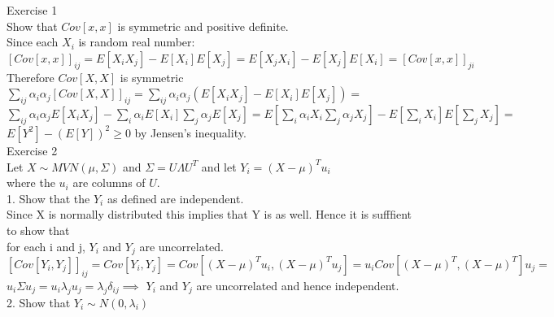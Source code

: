 \documentclass[18pt]{article}
\author{Adam Handwerger}
\begin{document}
\begin{flushleft}
Exercise 1\\
Show that $Cov[x,x]$ is symmetric and positive definite.\\
\vspace{.4cm}
Since each $X_i$ is random real number:
\vspace{.4cm}
$[Cov[x,x]]_{ij}=E[X_i X_j]-E[X_i]E[X_j]=E[X_j X_i]-E[X_j]E[X_i]=[Cov[x,x]]_{ji}$\\
\vspace{.4cm}
Therefore $Cov[X,X]$ is symmetric\\
\vspace{.4cm}
$\sum\limits_{ij} \alpha_i \alpha_j [Cov[X,X]]_{ij}=\sum\limits_{ij} \alpha_i \alpha_j (E[X_i X_j]-E[X_i]E[X_j])=$\\
$\sum\limits_{ij} \alpha_i \alpha_j E[X_i X_j]-\sum\limits_{i} \alpha_i E[X_i] \sum\limits_{j}\alpha_j E[X_j]=
E\left[ \sum\limits_{i} \alpha_i X_i \sum\limits_{j} \alpha_j X_j\right]-E\left[\sum\limits_{i} X_i \right]E\left[\sum\limits_{j} X_j\right]=$\\
\vspace{.4cm}
$E[Y^2]-(E[Y])^2 \geq0$ by Jensen's inequality.\\
\vspace{.4cm}
Exercise 2\\
\vspace{.4cm}
Let $X \sim  MVN(\mu,\Sigma)$ and $\Sigma=U \Lambda U^T$ and let $Y_i=(X-\mu)^T u_i$\\
\vspace{.4cm}
where the $u_i$ are columns of $U$.\\
\vspace{.4cm}
1. Show that the $Y_i$ as defined are independent.\\
\vspace{.4cm}
Since X is normally distributed this implies that Y is as well. Hence it is sufffient to show that\\
for each i and j, $Y_i$ and $Y_j$ are uncorrelated.\\
\vspace{.4cm}
$[Cov[Y_i,Y_j]]_{ij}=Cov[Y_i,Y_j]=Cov[(X-\mu)^T u_i,(X-\mu)^T u_j]=u_i Cov[(X-\mu)^T,(X-\mu)^T]u_j=$\\
$u_i \Sigma u_j= u_i \lambda_j u_j=\lambda_j \delta_{ij} \implies$
\vspace{.4cm}
$Y_i$ and $Y_j$ are uncorrelated and hence independent.\\
\vspace{.4cm}
2. Show that $Y_i \sim N(0,\lambda_i)$\\

\end{flushleft}
\end{document}
